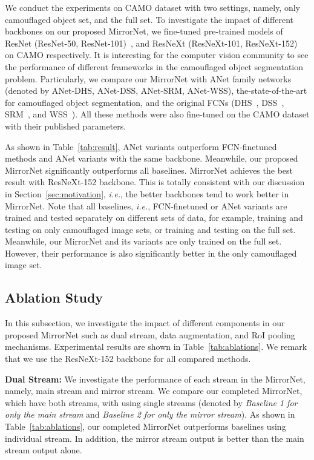 \documentclass[journal]{IEEEtran}
\begin{document}
We conduct the experiments on CAMO dataset with two settings, namely, only camouflaged object set, and the full set. To investigate the impact of different backbones on our proposed MirrorNet, we fine-tuned pre-trained models of ResNet (ResNet-50, ResNet-101)~\cite{He-CVPR2016}, and ResNeXt (ResNeXt-101, ResNeXt-152)~\cite{resnext} on CAMO respectively. It is interesting for the computer vision community to see the performance of different frameworks in the camouflaged object segmentation problem. Particularly, we compare our MirrorNet with ANet family networks~\cite{CAMO} (denoted by ANet-DHS, ANet-DSS, ANet-SRM, ANet-WSS), the-state-of-the-art for camouflaged object segmentation, and the original FCNs (DHS~\cite{Liu-CVPR2016}, DSS~\cite{Hou-CVPR2017}, SRM~\cite{Wang-ICCV2017}, and WSS~\cite{Wang-CVPR2017}). All these methods were also fine-tuned on the CAMO dataset with their published parameters.



As shown in Table~\ref{tab:result}, ANet variants outperform FCN-finetuned methods and ANet variants with the same backbone. Meanwhile, our proposed MirrorNet significantly outperforms all baselines. MirrorNet achieves the best result with ResNeXt-152 backbone. This is totally consistent with our discussion in Section~\ref{sec:motivation}, \textit{i.e.}, the better backbones tend to work better in MirrorNet. Note that all baselines, \textit{i.e.}, FCN-finetuned or ANet variants are trained and tested separately on different sets of data, for example, training and testing on only camouflaged image sets, or training and testing on the full set. Meanwhile, our MirrorNet and its variants are only trained on the full set. However, their performance is also significantly better in the only camouflaged image set. 







\subsection{Ablation Study}
\label{sec:ablation}
In this subsection, we investigate the impact of different components in our proposed MirrorNet such as dual stream, data augmentation, and RoI pooling mechanisms. Experimental results are shown in Table~\ref{tab:ablations}. We remark that we use the ResNeXt-152 backbone for all compared methods.

\textbf{Dual Stream: } We investigate the performance of each stream in the MirrorNet, namely, main stream and mirror stream. We compare our completed MirrorNet, which have both streams, with using single streams (denoted by \textit{Baseline 1 for only the main stream} and \textit{Baseline 2 for only the mirror stream}). As shown in Table~\ref{tab:ablations}, our completed MirrorNet outperforms baselines using individual stream. In addition, the mirror stream output is better than the main stream output alone. 
\end{document}
